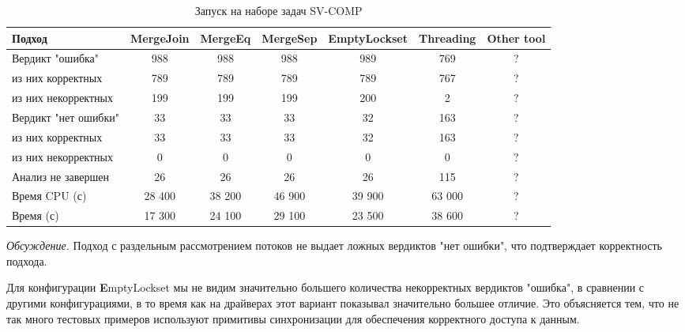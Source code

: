 
\begin{center}
  \begin{table}[h]\footnotesize
    \caption{Запуск на наборе задач SV-COMP}
    \begin{tabular}{ | l | c | c | c | c | c | c |}
      \hline
      Подход         & MergeJoin   & MergeEq & MergeSep & EmptyLockset & Threading & Other tool \\ \hline
      Вердикт "ошибка" & 988    & 988        & 988      & 989       & 769       & ?\\ 
  \hspace{0.5cm} из них корректных & 789 & 789 & 789      & 789       & 767       & ?\\ 
  \hspace{0.5cm} из них некорректных & 199 & 199 & 199    & 200       & 2         & ? \\ \hline
      Вердикт "нет ошибки"  & 33      & 33        & 33       & 32        & 163       & ? \\ 
  \hspace{0.5cm} из них корректных & 33 & 33    & 33       & 32        & 163       & ? \\
  \hspace{0.5cm} из них некорректных & 0 & 0    & 0        & 0         & 0         & ? \\ \hline
      Анализ не завершен       & 26     & 26         & 26       & 26        & 115       & ? \\ \hline
      Время CPU (с)   & 28 400 & 38 200     & 46 900  & 39 900    & 63 000    & ? \\ 
      Время (с)  & 17 300 & 24 100     & 29 100   & 23 500    & 38 600    & ? \\
      \hline
    \end{tabular}
  \end{table}
\end{center}

{\em Обсуждение.}
Подход с раздельным рассмотрением потоков не выдает ложных вердиктов "нет ошибки", что подтверждает корректность подхода.

Для конфигурации {\textbf EmptyLockset} мы не видим значительно большего количества некорректных вердиктов "ошибка", в сравнении с  другими конфигурациями, в то время как на драйверах этот вариант показывал значительно большее отличие.
Это объясняется тем, что не так много тестовых примеров используют примитивы синхронизации для обеспечения корректного доступа к данным.

